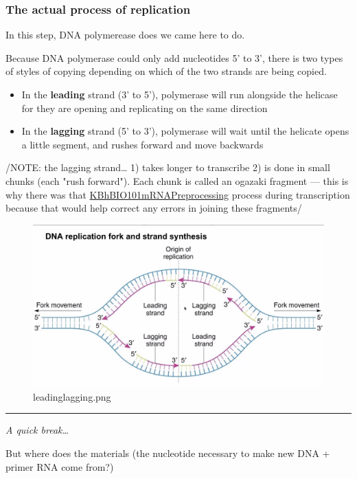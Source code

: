 \documentclass[letterpaper]{article}
\begin{document}
\subsubsection{The actual process of replication}
\label{sec:orgb45047b}
In this step, DNA polymerease does we came here to do.

Because DNA polymerase could only add nucleotides 5' to 3', there is two
types of styles of copying depending on which of the two strands are
being copied.

\begin{itemize}
\item In the \textbf{leading} strand (3' to 5'), polymerase will run alongside the
helicase for they are opening and replicating on the same direction
\item In the \textbf{lagging} strand (5' to 3'), polymerase will wait until the
helicate opens a little segment, and rushes forward and move backwards
\end{itemize}

/NOTE: the lagging strand\ldots{} 1) takes longer to transcribe 2) is done in
small chunks (each "rush forward"). Each chunk is called an ogazaki
fragment --- this is why there was that
\href{KBhBIO101mRNAPreprocessing.org}{KBhBIO101mRNAPreprocessing}
process during transcription because that would help correct any errors
in joining these fragments/

\begin{figure}[htbp]
\centering
\includegraphics[width=.9\linewidth]{leadinglagging.png}
\caption{leadinglagging.png}
\end{figure}

\noindent\rule{\textwidth}{0.5pt}

\emph{A quick break\ldots{}}

But where does the materials (the nucleotide necessary to make new DNA +
primer RNA come from?)
\end{document}
